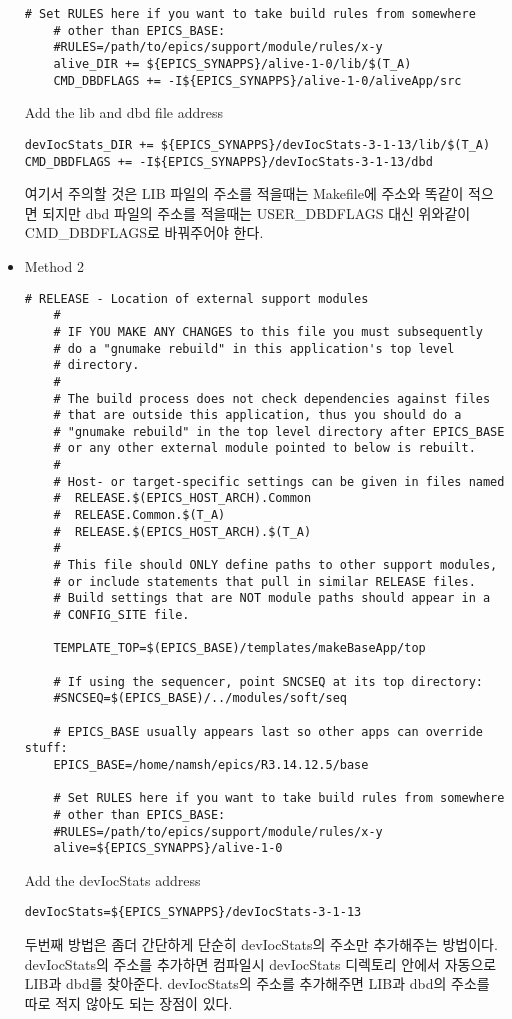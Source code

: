 \documentclass[11pt
  , a4paper
  , article
  , oneside
]{memoir}
\begin{document}
\begin{itemize}
\begin{lstlisting}[style=termstyle]
	# Set RULES here if you want to take build rules from somewhere
	# other than EPICS_BASE:
	#RULES=/path/to/epics/support/module/rules/x-y
	alive_DIR += ${EPICS_SYNAPPS}/alive-1-0/lib/$(T_A)
	CMD_DBDFLAGS += -I${EPICS_SYNAPPS}/alive-1-0/aliveApp/src
	\end{lstlisting}
	Add the lib and dbd file address
	\begin{lstlisting}[style=termstyle]
devIocStats_DIR += ${EPICS_SYNAPPS}/devIocStats-3-1-13/lib/$(T_A)
CMD_DBDFLAGS += -I${EPICS_SYNAPPS}/devIocStats-3-1-13/dbd
\end{lstlisting}
	여기서 주의할 것은 LIB 파일의 주소를 적을때는 Makefile에 주소와 똑같이 적으면 되지만 dbd 파일의 주소를 
	적을때는 USER\_DBDFLAGS 대신 위와같이 CMD\_DBDFLAGS로 바꿔주어야 한다.
	\item Method 2
	\begin{lstlisting}[style=termstyle]
	# RELEASE - Location of external support modules
	#
	# IF YOU MAKE ANY CHANGES to this file you must subsequently
	# do a "gnumake rebuild" in this application's top level
	# directory.
	#
	# The build process does not check dependencies against files
	# that are outside this application, thus you should do a
	# "gnumake rebuild" in the top level directory after EPICS_BASE
	# or any other external module pointed to below is rebuilt.
	#
	# Host- or target-specific settings can be given in files named
	#  RELEASE.$(EPICS_HOST_ARCH).Common
	#  RELEASE.Common.$(T_A)
	#  RELEASE.$(EPICS_HOST_ARCH).$(T_A)
	#
	# This file should ONLY define paths to other support modules,
	# or include statements that pull in similar RELEASE files.
	# Build settings that are NOT module paths should appear in a
	# CONFIG_SITE file.
	
	TEMPLATE_TOP=$(EPICS_BASE)/templates/makeBaseApp/top
	
	# If using the sequencer, point SNCSEQ at its top directory:
	#SNCSEQ=$(EPICS_BASE)/../modules/soft/seq
	
	# EPICS_BASE usually appears last so other apps can override stuff:
	EPICS_BASE=/home/namsh/epics/R3.14.12.5/base
	
	# Set RULES here if you want to take build rules from somewhere
	# other than EPICS_BASE:
	#RULES=/path/to/epics/support/module/rules/x-y
	alive=${EPICS_SYNAPPS}/alive-1-0
	\end{lstlisting}
	Add the devIocStats address
	\begin{lstlisting}[style=termstyle]
devIocStats=${EPICS_SYNAPPS}/devIocStats-3-1-13
\end{lstlisting}
	두번째 방법은 좀더 간단하게 단순히 devIocStats의 주소만 추가해주는 방법이다. devIocStats의 주소를 추가하면 컴파일시 devIocStats 디렉토리 안에서 자동으로 LIB과 dbd를 찾아준다. devIocStats의 주소를 추가해주면 LIB과 dbd의 주소를 따로 적지 않아도 되는 장점이 있다. 
\end{itemize}
\end{document}
